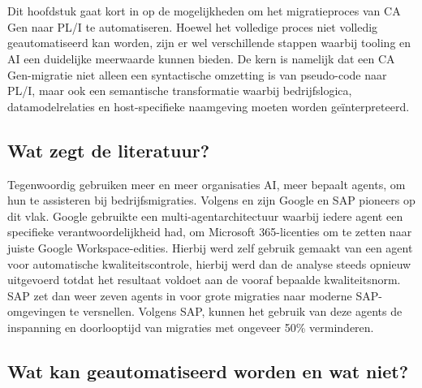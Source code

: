 
\chapter{}%
\label{ch:automatisatie}

Dit hoofdstuk gaat kort in op de mogelijkheden om het migratieproces
van CA Gen naar PL/I te automatiseren. Hoewel het volledige proces niet
volledig geautomatiseerd kan worden, zijn er wel verschillende stappen
waarbij tooling en AI een duidelijke meerwaarde kunnen bieden. De kern is
namelijk dat een CA Gen-migratie niet alleen een syntactische omzetting is
van pseudo-code naar PL/I, maar ook een semantische transformatie waarbij
bedrijfslogica, datamodelrelaties en host-specifieke naamgeving moeten
worden geïnterpreteerd.

\section{Wat zegt de literatuur?}
\label{sec:literatuur-automatisatie}
Tegenwoordig gebruiken meer en meer organisaties AI, meer bepaalt agents, om hun te assisteren bij bedrijfsmigraties.
Volgens \textcite{Bueters2026} en \textcite{Uptodate2026} zijn Google en SAP pioneers op dit vlak. Google gebruikte
een multi-agentarchitectuur waarbij iedere agent een specifieke verantwoordelijkheid had, om Microsoft 365-licenties
om te zetten naar juiste Google Workspace-edities. Hierbij werd zelf gebruik gemaakt van een agent voor automatische kwaliteitscontrole, hierbij werd dan de analyse steeds opnieuw uitgevoerd totdat het resultaat voldoet aan de vooraf bepaalde kwaliteitsnorm. SAP zet dan weer zeven agents in voor grote migraties naar moderne SAP-omgevingen te versnellen. Volgens SAP, kunnen het gebruik van deze agents de inspanning en doorlooptijd van migraties met ongeveer 50\% verminderen. 

\section{Wat kan geautomatiseerd worden en wat niet?}
\label{sec:automatisatie-mogelijkheden}

